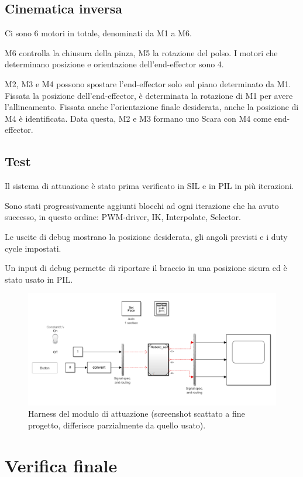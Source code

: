 \documentclass[12pt]{report}
\begin{document}
\section{Cinematica inversa}

Ci sono 6 motori in totale, denominati da M1 a M6.

M6 controlla la chiusura della pinza, M5 la rotazione del polso. I motori che determinano posizione e orientazione dell'end-effector sono 4.

M2, M3 e M4 possono spostare l'end-effector solo sul piano determinato da M1. Fissata la posizione dell'end-effector, è determinata la rotazione di M1 per avere l'allineamento. Fissata anche l'orientazione finale desiderata, anche la posizione di M4 è identificata. Data questa, M2 e M3 formano uno Scara con M4 come end-effector.

\section{Test}

Il sistema di attuazione è stato prima verificato in SIL e in PIL in più iterazioni.

Sono stati progressivamente aggiunti blocchi ad ogni iterazione che ha avuto successo, in questo ordine: PWM-driver, IK, Interpolate, Selector.

Le uscite di debug mostrano la posizione desiderata, gli angoli previsti e i duty cycle impostati.

Un input di debug permette di riportare il braccio in una posizione sicura ed è stato usato in PIL.

\begin{figure}
\includegraphics[width=\textwidth]{Harness}
\caption{Harness del modulo di attuazione (screenshot scattato a fine progetto, differisce parzialmente da quello usato).}
\end{figure}

\chapter{Verifica finale}
\end{document}
